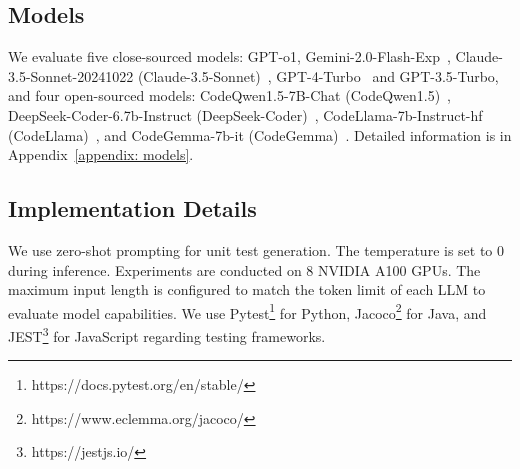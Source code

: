 \subsection{Models}
We evaluate five close-sourced models: GPT-o1, Gemini-2.0-Flash-Exp~\cite{team2024gemini},  Claude-3.5-Sonnet-20241022 (Claude-3.5-Sonnet)~\cite{anthropic2024claude}, GPT-4-Turbo~\cite{achiam2023gpt} and GPT-3.5-Turbo, and four open-sourced models: CodeQwen1.5-7B-Chat (CodeQwen1.5)~\cite{bai2023qwen}, DeepSeek-Coder-6.7b-Instruct (DeepSeek-Coder)~\cite{guo2024deepseek, zhu2024deepseek}, CodeLlama-7b-Instruct-hf (CodeLlama)~\cite{roziere2023code}, and CodeGemma-7b-it (CodeGemma)~\cite{team2024codegemma}. Detailed information is in Appendix~\ref{appendix: models}.

\subsection{Implementation Details}
We use zero-shot prompting for unit test generation. 
The temperature is set to 0 during inference.
Experiments are conducted on 8 NVIDIA A100 GPUs. 
The maximum input length is configured to match the token limit of each LLM to evaluate model capabilities.
We use Pytest\footnote{https://docs.pytest.org/en/stable/} for Python, Jacoco\footnote{https://www.eclemma.org/jacoco/} for Java, and JEST\footnote{https://jestjs.io/} for JavaScript regarding testing frameworks.

